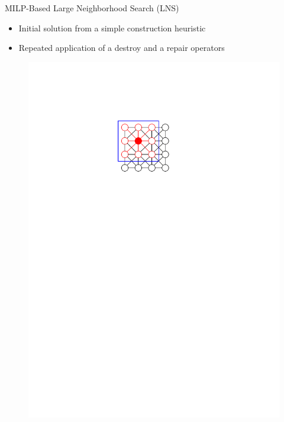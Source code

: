 \documentclass[aspectratio=1610]{beamer}
\newcommand{\important}[1]{{\color{green!60!black}#1}}
\begin{document}
\begin{frame}{MILP-Based Large Neighborhood Search (LNS)}
	\begin{itemize}
		\item Initial solution from a simple construction heuristic
		\item Repeated application of a \important{destroy} and a \important{repair} operators
	\end{itemize}
	\begin{figure}
		\begin{overprint}
			\centering\includegraphics[width=\textwidth, page=10]{graphics/graphics.pdf}

\end{overprint}
\end{figure}
\end{frame}
\end{document}
